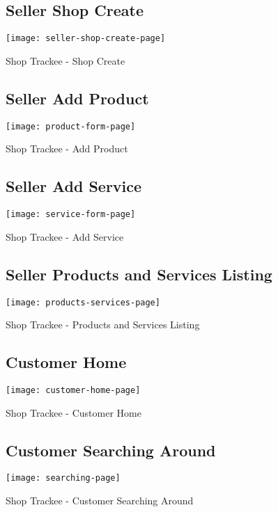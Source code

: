 \begin{figure}[h]
	\subsection{Seller Shop Create}
	\centering
	\texttt{[image: seller-shop-create-page]}
	\caption{Shop Trackee - Shop Create}
\end{figure}
\newpage

\begin{figure}[h]
	\subsection{Seller Add Product}
	\centering
	\texttt{[image: product-form-page]}
	\caption{Shop Trackee - Add Product}
\end{figure}

\begin{figure}[h]
	\subsection{Seller Add Service}
	\centering
	\texttt{[image: service-form-page]}
	\caption{Shop Trackee - Add Service}
\end{figure}
\newpage

\begin{figure}[h]
	\subsection{Seller Products and Services Listing}
	\centering
	\texttt{[image: products-services-page]}
	\caption{Shop Trackee - Products and Services Listing}
\end{figure}


\begin{figure}[h]
	\subsection{Customer Home}
	\centering
	\texttt{[image: customer-home-page]}
	\caption{Shop Trackee - Customer Home}
\end{figure}
\newpage

\begin{figure}[h]
	\subsection{Customer Searching Around}
	\centering
	\texttt{[image: searching-page]}
	\caption{Shop Trackee - Customer Searching Around}
\end{figure}


